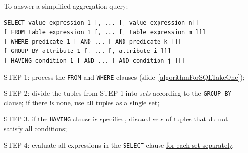 \documentclass[xcolor={usenames,dvipsnames}]{beamer}
\begin{document}
%
%



%
%

\begin{frame}[fragile]

To answer a simplified aggregation query:

\begin{center}
  \begin{lstlisting}[style=SQL]
  SELECT value expression 1 [, ... [, value expression n]]
[ FROM table expression 1 [, ... [, table expression m ]]]
[ WHERE predicate 1 [ AND ... [ AND predicate k ]]]
[ GROUP BY attribute 1 [, ... [, attribute i ]]]
[ HAVING condition 1 [ AND ... [ AND condition j ]]]
\end{lstlisting}
\end{center}


STEP 1: process the \lstinline[style=SQL]{FROM} and \lstinline[style=SQL]{WHERE} clauses (slide~\ref{algorithmForSQLTakeOne});

STEP 2: divide the tuples from STEP 1 into \emph{sets} according to the \lstinline[style=SQL]{GROUP BY} clause; if there is none, use all tuples as a single set;

STEP 3: if the \lstinline[style=SQL]{HAVING} clause is specified, discard sets of tuples that do not satisfy all conditions;

STEP 4: evaluate all expressions in the \lstinline[style=SQL]{SELECT} clause \underline{for each set separately}.
\end{frame}
\end{document}
